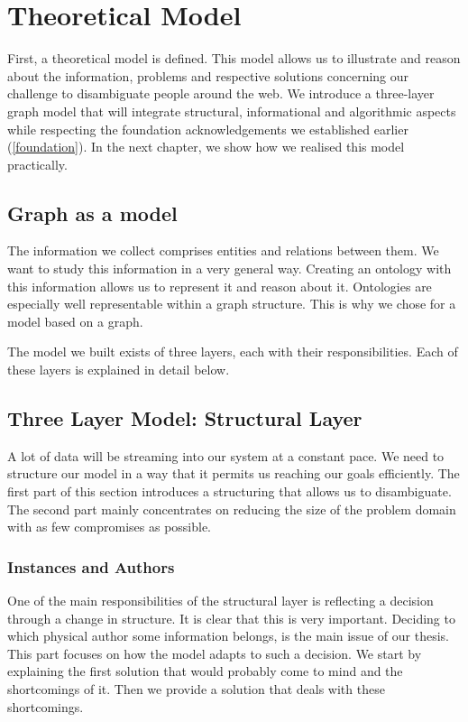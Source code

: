 \chapter{Theoretical Model}

First, a theoretical model is defined. This model allows us to illustrate and reason about the information, problems and respective solutions concerning our challenge to disambiguate people around the web. We introduce a three-layer graph model that will integrate structural, informational and algorithmic aspects while respecting the foundation acknowledgements we established earlier (\autoref{foundation}). In the next chapter, we show how we realised this model practically.

\section{Graph as a model}

The information we collect comprises entities and relations between them. We want to study this information in a very general way. Creating an ontology with this information allows us to represent it and reason about it. Ontologies are especially well representable within a graph structure. This is why we chose for a model based on a graph.

The model we built exists of three layers, each with their responsibilities. Each of these layers is explained in detail below.

\section{Three Layer Model: Structural Layer}

A lot of data will be streaming into our system at a constant pace. We need to structure our model in a way that it permits us reaching our goals efficiently. The first part of this section introduces a structuring that allows us to disambiguate. The second part mainly concentrates on reducing the size of the problem domain with as few compromises as possible.

\subsection{Instances and Authors}

One of the main responsibilities of the structural layer is reflecting a decision through a change in structure. It is clear that this is very important. Deciding to which physical author some information belongs, is the main issue of our thesis. This part focuses on how the model adapts to such a decision. We start by explaining the first solution that would probably come to mind and the shortcomings of it. Then we provide a solution that deals with these shortcomings.

